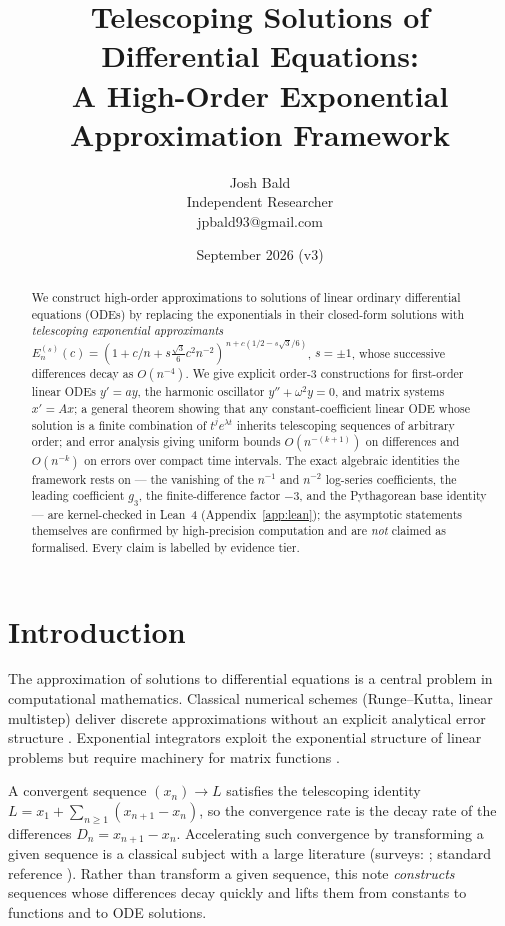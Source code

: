 \documentclass[11pt]{article}
\title{\bf Telescoping Solutions of Differential Equations:\\
A High-Order Exponential Approximation Framework}
\author{Josh Bald\\ \small Independent Researcher\\ \small jpbald93@gmail.com}
\date{September 2026 \quad (v3)}
\theoremstyle{plain}
\theoremstyle{definition}
\theoremstyle{remark}
\begin{document}
\maketitle

\begin{abstract}
We construct high-order approximations to solutions of linear ordinary
differential equations (ODEs) by replacing the exponentials in their closed-form
solutions with \emph{telescoping exponential approximants}
$E_n^{(s)}(c) = (1 + c/n + s\tfrac{\sqrt3}{6}c^2 n^{-2})^{\,n + c(1/2 - s\sqrt3/6)}$,
$s=\pm1$, whose successive differences decay as $O(n^{-4})$. We give explicit
order-3 constructions for first-order linear ODEs $y'=ay$, the harmonic
oscillator $y''+\omega^2 y=0$, and matrix systems $x'=Ax$; a general theorem
showing that any constant-coefficient linear ODE whose solution is a finite
combination of $t^j e^{\lambda t}$ inherits telescoping sequences of arbitrary
order; and error analysis giving uniform bounds $O(n^{-(k+1)})$ on differences
and $O(n^{-k})$ on errors over compact time intervals. The exact algebraic
identities the framework rests on --- the vanishing of the $n^{-1}$ and $n^{-2}$
log-series coefficients, the leading coefficient $g_3$, the finite-difference
factor $-3$, and the Pythagorean base identity --- are kernel-checked in Lean~4
(Appendix~\ref{app:lean}); the asymptotic statements themselves are confirmed by
high-precision computation and are \emph{not} claimed as formalised. Every claim
is labelled by evidence tier.
\end{abstract}

\section{Introduction}

The approximation of solutions to differential equations is a central problem in
computational mathematics. Classical numerical schemes (Runge--Kutta, linear
multistep) deliver discrete approximations without an explicit analytical error
structure \cite{Butcher}. Exponential integrators \cite{HochbruckOstermann,
HochbruckLubichSelhofer} exploit the exponential structure of linear problems but
require machinery for matrix functions \cite{AlMohyHigham,Higham2008}.

A convergent sequence $(x_n)\to L$ satisfies the telescoping identity
$L = x_1 + \sum_{n\ge1}(x_{n+1}-x_n)$, so the convergence rate is the decay rate
of the differences $D_n = x_{n+1}-x_n$. Accelerating such convergence by
transforming a given sequence is a classical subject with a large literature
(surveys: \cite{Weniger,BrezinskiRZ}; standard reference \cite[\S3.9]{DLMF}).
Rather than transform a given sequence, this note \emph{constructs} sequences
whose differences decay quickly and lifts them from constants to functions and to
ODE solutions.
\end{document}
